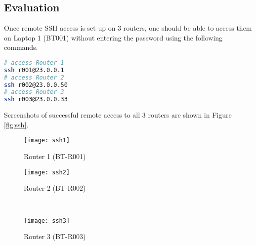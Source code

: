 \subsection{Evaluation}

Once remote SSH access is set up on 3 routers, one should be able to access them on Laptop 1 (BT001) without entering the password using the following commands.

\begin{lstlisting}[language=sh]
# access Router 1
ssh r001@23.0.0.1 
# access Router 2
ssh r002@23.0.0.50
# access Router 3
ssh r003@23.0.0.33
\end{lstlisting}

Screenshots of successful remote access to all $3$ routers are shown in Figure \ref{fig:ssh}.

\begin{figure*}[ht!]
    \centering
    \begin{subfigure}[b]{0.67\textwidth}
        \centering
        \texttt{[image: ssh1]}
        \caption{Router 1 (BT-R001)}
    \end{subfigure}
    \hfill
    \begin{minipage}[b]{0.3\textwidth}
	    \begin{subfigure}[b]{\linewidth}
	        \centering
	        \texttt{[image: ssh2]}
	        \caption{Router 2 (BT-R002)}
	    \end{subfigure}
	    \\
	    \begin{subfigure}[b]{\linewidth}
	        \centering
	        \texttt{[image: ssh3]}
	        \caption{Router 3 (BT-R003)}
	    \end{subfigure}
	\end{minipage}
    \caption{Sucessful remote SSH access to all 3 routers from Laptop 1 (BT001).}
    \label{fig:ssh}
\end{figure*}



